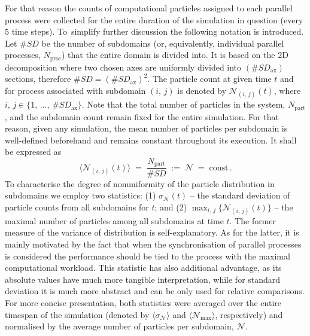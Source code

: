 \documentclass{pracamgren}
\begin{document}
For that reason the counts of computational particles assigned to each parallel process were collected for the entire duration of the simulation in question (every $5$ time steps).
To~simplify further discussion the following notation is introduced.
Let $\#SD$ be the number of subdomains (or, equivalently, individual parallel processes, $N_{\text{proc}}$) that the entire domain is divided into.
It is based on the 2D decomposition where two chosen axes are uniformly divided into $(\#SD_{\text{ax}})$ sections, therefore $\#SD = \left( \#SD_{\text{ax}} \right)^2$.
The particle count at given time $t$ and for process associated with subdomain $(i,\,j)$ is denoted by $\mathcal{N}_{(i,\,j)}(t)$, where ${i,\,j \in \{ 1, \, \ldots , \, \#SD_{\text{ax}} \}}$.
Note that the total number of particles in the system, $N_{\text{part}}$, and the subdomain count remain fixed for the entire simulation.
For that reason, given any simulation, the mean number of particles per subdomain is well-defined beforehand and remains constant throughout its execution.
It shall be expressed as 
\begin{equation}
\langle \mathcal{N}_{(i,\,j)}(t) \rangle \; = \; \frac{N_{\text{part}}}{\#SD} \; := \; \mathcal{N} \; = \; \text{const} \, .
\label{eqn:pfp-avg}
\end{equation}
To characterise the degree of nonuniformity of the particle distribution in subdomains we employ two statistics: (1) $\sigma_{\mathcal{N}}(t)$ -- the standard deviation of particle counts from all subdomains for $t$; and (2) $\max_{i,\,j}\{\mathcal{N}_{(i,\,j)}(t)\}$ -- the maximal number of particles among all subdomains at time $t$.
The former measure of the variance of distribution is self-explanatory.
As for the latter, it is mainly motivated by the fact that when the synchronisation of parallel processes is considered the performance should be tied to the process with the maximal computational workload.
This statistic has also additional advantage, as its absolute values have much more tangible interpretation, while for standard deviation it is much more abstract and can be only used for relative comparisons. 
For more concise presentation, both statistics were averaged over the entire timespan of the simulation (denoted by $\langle \sigma_{\mathcal{N}} \rangle$ and $\langle \mathcal{N}_{\max} \rangle$, respectively) and normalised by the average number of particles per subdomain, $\mathcal{N}$.

\medskip
\end{document}
